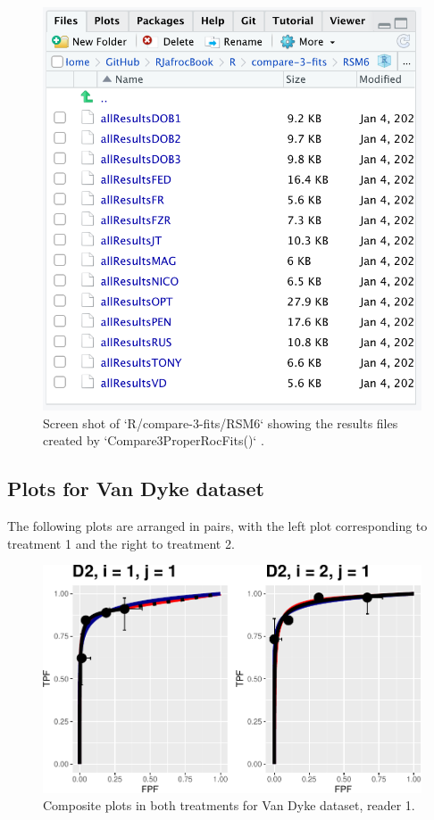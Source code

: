 \documentclass[
]{book}
\begin{document}
\begin{figure}

{\centering \includegraphics{images/compare-3-fits/RSM6} 

}

\caption{Screen shot of `R/compare-3-fits/RSM6` showing the results files created by  `Compare3ProperRocFits()` .}\label{fig:rsm-3-fits-all-results-rsm6}
\end{figure}

\hypertarget{rsm-3-fits-representative-plots-van-dyke}{%
\subsection{Plots for Van Dyke dataset}\label{rsm-3-fits-representative-plots-van-dyke}}

The following plots are arranged in pairs, with the left plot corresponding to treatment 1 and the right to treatment 2.

\begin{figure}
\centering
\includegraphics{10-rsm-3-fits_files/figure-latex/rsm-3-fits-plots-1-1-1.pdf}
\caption{\label{fig:rsm-3-fits-plots-1-1}Composite plots in both treatments for Van Dyke dataset, reader 1.}
\end{figure}
\end{document}

